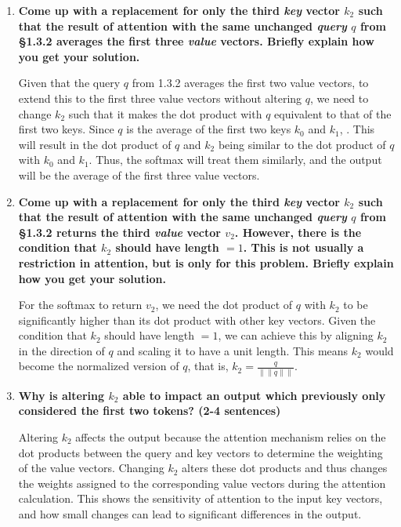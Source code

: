 \documentclass{article}
\begin{document}
\begin{enumerate}
    \item \textbf{Come up with a replacement for only the third \textit{key}
    vector $k_2$ such that the result of attention with the same unchanged
    \textit{query} $q$ from \S 1.3.2 averages the first three \textit{value}
    vectors. Briefly explain how you get your solution.}

    Given that the query $q$ from 1.3.2 averages the first two value vectors, to
    extend this to the first three value vectors without altering $q$, we need
    to change $k_2$ such that it makes the dot product with $q$ equivalent to
    that of the first two keys. Since $q$ is the average of the first two keys
    $k_0$ and $k_1$, . This
    will result in the dot product of $q$ and $k_2$ being similar to the dot
    product of $q$ with $k_0$ and $k_1$. Thus, the softmax will treat them
    similarly, and the output will be the average of the first three value
    vectors.

    \item \textbf{Come up with a replacement for only the third \textit{key}
    vector $k_2$ such that the result of attention with the same unchanged
    \textit{query} $q$ from \S 1.3.2 returns the third \textit{value} vector
    $v_2$. However, there is the condition that $k_2$ should have length $=1$.
    This is not usually a restriction in attention, but is only for this
    problem. Briefly explain how you get your solution.}

    For the softmax to return $v_2$, we need the dot product of $q$ with $k_2$
    to be significantly higher than its dot product with other key vectors.
    Given the condition that $k_2$ should have length $= 1$, we can achieve this
    by aligning $k_2$ in the direction of $q$ and scaling it to have a unit
    length. This means $k_2$ would become the normalized version of $q$, that
    is, $\boxed{k_2 = \frac{q}{\|\|q\|\|}}$.

    \item \textbf{Why is altering $k_2$ able to impact an output which
    previously only considered the first two tokens? (2-4 sentences)}

    Altering $k_2$ affects the output because the attention mechanism relies on
    the dot products between the query and key vectors to determine the
    weighting of the value vectors. Changing $k_2$ alters these dot products and
    thus changes the weights assigned to the corresponding value vectors during
    the attention calculation. This shows the sensitivity of attention to the
    input key vectors, and how small changes can lead to significant differences
    in the output.
\end{enumerate}
\end{document}
